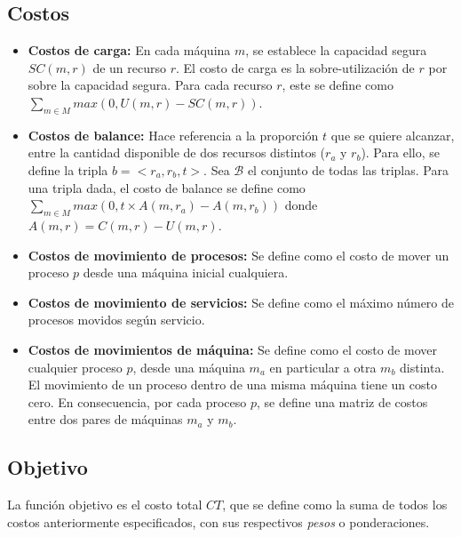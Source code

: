 \subsection{Costos}
\begin{itemize}
	
	\item \textbf{Costos de carga:} En cada máquina $m$, se establece la capacidad segura $SC(m,r)$ de un recurso $r$. El costo de carga es la sobre-utilización de $r$ por sobre la capacidad segura. Para cada recurso $r$, este se define como $\sum_{m \in M}max(0,U(m,r) - SC(m,r))$.
	
	\item \textbf{Costos de balance:} Hace referencia a la proporción $t$ que se quiere alcanzar, entre la cantidad disponible de dos recursos distintos ($r_a$ y $r_b$). Para ello, se define la tripla $b = <r_a,r_b,t>$. Sea $\mathcal{B}$ el conjunto de todas las triplas. Para una tripla dada, el costo de balance se define como $\sum_{m \in M}max(0, t\times A(m,r_a) - A(m,r_b))$ donde $A(m,r) = C(m,r) - U(m,r)$.
	    
	\item \textbf{Costos de movimiento de procesos:} Se define como el costo de mover un proceso $p$ desde una máquina inicial cualquiera. 
	
	\item \textbf{Costos de movimiento de servicios:} Se define como el máximo número de procesos movidos según servicio. 
	
	\item \textbf{Costos de movimientos de máquina:} Se define como el costo de mover cualquier proceso $p$, desde una máquina $m_a$ en particular a otra $m_b$ distinta. El movimiento de un proceso dentro de una misma máquina tiene un costo cero. En consecuencia, por cada proceso $p$, se define una matriz de costos entre dos pares de máquinas $m_a$ y $m_b$.
	
\end{itemize}

\subsection{Objetivo}
La función objetivo es el costo total $CT$, que se define como la suma de todos los costos anteriormente especificados, con sus respectivos \textit{pesos} o ponderaciones. \\

